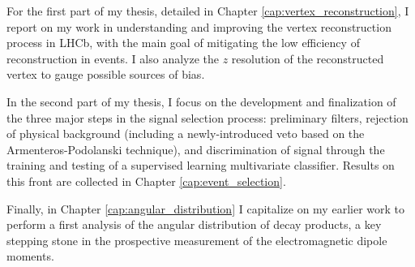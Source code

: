 For the first part of my thesis, detailed in Chapter \ref{cap:vertex_reconstruction}, I report on my work in understanding and improving the vertex reconstruction process in LHCb, with the main goal of mitigating the low efficiency of \lambdadecay reconstruction in \demonstratorshort events.
I also analyze the $z$ resolution of the reconstructed \lz vertex to gauge possible sources of bias.

In the second part of my thesis, I focus on the development and finalization of the three major steps in the signal selection process: preliminary filters, rejection of \physbkgshort physical background (including a newly-introduced \kshort veto based on the Armenteros-Podolanski technique), and discrimination of signal through the training and testing of a supervised learning multivariate classifier.
Results on this front are collected in Chapter \ref{cap:event_selection}.

Finally, in Chapter \ref{cap:angular_distribution} I capitalize on my earlier work to perform a first analysis of the angular distribution of \lambdadecay decay products, a key stepping stone in the prospective measurement of the \lz electromagnetic dipole moments.
